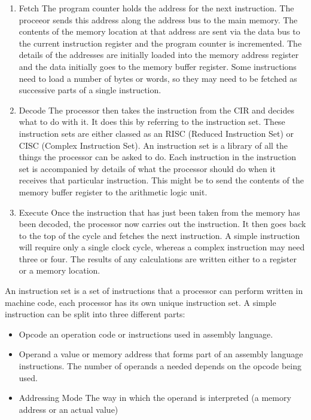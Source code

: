   \begin{enumerate}
    \item Fetch
      \subitem The program counter holds the address for the next instruction. The proceeor sends this address along the address bus to the main memory. The contents of the memory location at that address are sent via the data bus to the current instruction register and the program counter is incremented. The details of the addresses are initially loaded into the memory address register and the data initially goes to the memory buffer register. Some instructions need to load a number of bytes or words, so they may need to be fetched as successive parts of a single instruction.
    \item Decode
      \subitem The processor then takes the instruction from the CIR and decides what to do with it. It does this by referring to the instruction set. These instruction sets are either classed as an RISC (Reduced Instruction Set) or CISC (Complex Instruction Set). An instruction set is a library of all the things the processor can be asked to do. Each instruction in the instruction set is accompanied by details of what the processor should do when it receives that particular instruction. This might be to send the contents of the memory buffer register to the arithmetic logic unit.
    \item Execute
      \subitem Once the instruction that has just been taken from the memory has been decoded, the processor now carries out the instruction. It then goes back to the top of the cycle and fetches the next instruction. A simple instruction will require only a single clock cycle, whereas a complex instruction may need three or four. The results of any calculations are written either to a register or a memory location.
  \end{enumerate}
  An instruction set is a set of instructions that a processor can perform written in machine code, each processor has its own unique instruction set. A simple instruction can be split into three different parts:
  \begin{itemize}
    \item Opcode
      \subitem an operation code or instructions used in assembly language.
    \item Operand
      \subitem a value or memory address that forms part of an assembly language instructions. The number of operands a needed depends on the opcode being used.
    \item Addressing Mode
      \subitem The way in which the operand is interpreted (a memory address or an actual value)
  \end{itemize}
